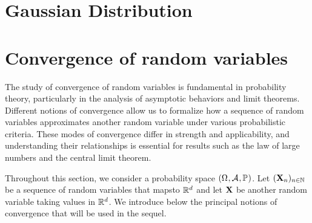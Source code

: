 \documentclass[../Main.tex]{subfiles}
\begin{document}
\section{Gaussian Distribution} \label{sec:gaussian_sec}
\lipsum


\section{Convergence of random variables} 

The study of convergence of random variables is fundamental in probability theory, particularly in the analysis of asymptotic behaviors and limit theorems. Different notions of convergence allow us to formalize how a sequence of random variables approximates another random variable under various probabilistic criteria. These modes of convergence differ in strength and applicability, and understanding their relationships is essential for results such as the law of large numbers and the central limit theorem.

Throughout this section, we consider a probability space $(\Omega_{}, \mathcal{A}_{}, \mathbb{P}_{})$. Let $(\mathbf{X}_n)_{n\in\mathbb{N}}$ be a sequence of random variables that mapsto $\mathbb{R}^d$ and let $\mathbf{X}$ be another random variable taking values in $\mathbb{R}^d$. We introduce below the principal notions of convergence that will be used in the sequel.


\end{document}
